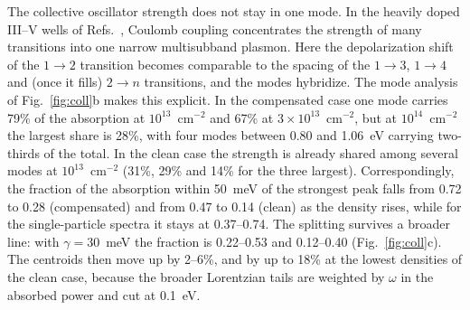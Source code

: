 \documentclass[11pt]{article}
\begin{document}
The collective oscillator strength does not stay in one mode. In the heavily doped III--V wells of Refs.~\cite{Delteil2012,Vasanelli2020}, Coulomb coupling concentrates the strength of many transitions into one narrow multisubband plasmon. Here the depolarization shift of the $1\to2$ transition becomes comparable to the spacing of the $1\to3$, $1\to4$ and (once it fills) $2\to n$ transitions, and the modes hybridize. The mode analysis of Fig.~\ref{fig:coll}b makes this explicit. In the compensated case one mode carries 79\% of the absorption at $10^{13}$~cm$^{-2}$ and 67\% at $3\times10^{13}$~cm$^{-2}$, but at $10^{14}$~cm$^{-2}$ the largest share is 28\%, with four modes between 0.80 and 1.06~eV carrying two-thirds of the total. In the clean case the strength is already shared among several modes at $10^{13}$~cm$^{-2}$ (31\%, 29\% and 14\% for the three largest). Correspondingly, the fraction of the absorption within 50~meV of the strongest peak falls from 0.72 to 0.28 (compensated) and from 0.47 to 0.14 (clean) as the density rises, while for the single-particle spectra it stays at 0.37--0.74. The splitting survives a broader line: with $\gamma=30$~meV the fraction is 0.22--0.53 and 0.12--0.40 (Fig.~\ref{fig:coll}c). The centroids then move up by 2--6\%, and by up to 18\% at the lowest densities of the clean case, because the broader Lorentzian tails are weighted by $\omega$ in the absorbed power and cut at 0.1~eV.
\end{document}
